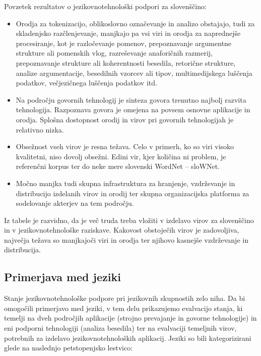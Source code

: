 \begin{multicols}{2}
Povzetek rezultatov o jezikovnotehnološki podpori za slovenščino:

\begin{itemize}
\item Orodja za tokenizacijo, oblikoslovno označevanje in analizo obstajajo, tudi za skladenjsko razčlenjevanje, manjkajo pa vsi viri in orodja za naprednejše procesiranje, kot je razločevanje po\-menov, prepoznavanje argumentne strukture ali po\-menskih vlog, razreševanje anaforičnih razmerij, prepoznavanje strukture ali koherentnosti besedila, retorične strukture, analize argumentacije, besedilnih vzorcev ali tipov, multimedijskega luščenja podatkov, večjezičnega luščenja podatkov itd. 
\item Na področju go\-vornih tehnologij je sinteza go\-vora trenutno naj\-bolj razvita tehnologija. Razpoznava go\-vora je  omejena na povsem osnovne aplikacije in orodja. Splošna dostopnost orodij in virov pri go\-vornih tehnologijah je relativno nizka.
\item Obsežnost vseh virov je resna težava. Celo v primerh, ko so viri visoko kvalitetni, niso dovolj obsežni. Edini vir, kjer količina ni problem, je referenčni korpus ter do neke mere slovenski WordNet -- sloWNet.
\item Močno manjka tudi skupna infrastruktura za hranjenje, vzdrževanje in distribucijo izdelanih virov in orodij ter skupna organizacij\-ska platforma za sodelovanje akterjev na tem področju.
\end{itemize}

Iz tabele je razvidno, da je več truda treba vložiti v izdelavo virov  za slovenščino in v jezikovnotehnološke raziskave. Kakovost obstoječih virov je zadovoljiva, naj\-večja težava so manj\-kajoči viri in orodja ter njihovo kasnejše vzdrževanje in distribucija.

\subsection{Primerjava med jeziki}

Stanje jezikovnotehnološke podpore pri jezikovnih skupnostih zelo niha. Da bi omogočili primerjavo med jeziki, v tem delu prikazujemo evalvacijo stanja, ki temelji na dveh področjih aplikacije (stroj\-no prevajanje in go\-vorne tehnologije) in eni podporni tehnologiji (analiza besedila) ter na evalvaciji temeljnih virov, potrebnih za izdelavo jezikovnotehnoloških aplikacij. Jeziki so bili kategorizirani glede na naslednjo petstopenjsko lestvico:


\end{multicols}
